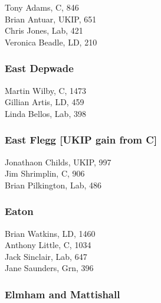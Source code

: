 \documentclass[a4paper,openany,10pt]{book}
\begin{document}


Tony Adams, C, 846\\
Brian Antuar, UKIP, 651\\
Chris Jones, Lab, 421\\
Veronica Beadle, LD, 210\\


\subsubsection*{East Depwade}



Martin Wilby, C, 1473\\
Gillian Artis, LD, 459\\
Linda Bellos, Lab, 398\\


\subsubsection*{East Flegg \hspace*{\fill}\nolinebreak[1]%
\enspace\hspace*{\fill}
[UKIP gain from C]}



Jonathaon Childs, UKIP, 997\\
Jim Shrimplin, C, 906\\
Brian Pilkington, Lab, 486\\


\subsubsection*{Eaton}



Brian Watkins, LD, 1460\\
Anthony Little, C, 1034\\
Jack Sinclair, Lab, 647\\
Jane Saunders, Grn, 396\\


\subsubsection*{Elmham and Mattishall}

\end{document}
